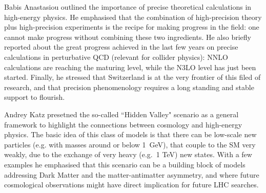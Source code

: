 Babis Anastasiou outlined the importance of precise theoretical calculations in high-energy 
physics. He emphasised that the combination of high-precision theory plus 
high-precision experiments is the recipe for making progress in the field: 
one cannot make progress without combining these two ingredients. He also briefly reported about the great progress
achieved in the last few years on precise calculations in 
perturbative QCD (relevant for collider physics): NNLO calculations are reaching 
the maturing level, while the N3LO level has just been started. 
Finally, he stressed that Switzerland is at the very frontier of this filed of research,
 and that precision phenomenology requires a long standing and stable support to flourish.
 
 Andrey Katz presetned the so-called ``Hidden Valley"  scenario as a general
framework to highlight the connections between cosmology and high-energy physics.
 The basic idea of this class of models is that there can be low-scale new particles
  (e.g. with masses around or below 1~GeV), that couple to the SM very weakly, 
  due to the exchange of very heavy (e.g.~1 TeV) new states. With a few examples he 
  emphasised that this scenario can be a building block of models addressing 
Dark Matter and the matter-antimatter asymmetry, and where  
future cosmological observations might have direct implication for future LHC searches.



